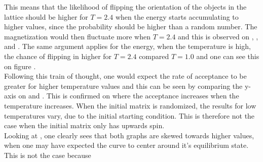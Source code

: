 \documentclass[10pt,a4paper]{article}
\begin{document}
\noindent This means that the likelihood of flipping the orientation of the objects in the lattice should be higher for $T = 2.4$ when the energy starts accumulating to higher values, since the probability should be higher than a random number. The magnetization would then fluctuate more when $T = 2.4$ and this is observed on , ,  and . The same argument applies for the energy, when the temperature is high, the chance of flipping in higher for $T = 2.4$ compared $T = 1.0$ and one can see this on figure  .
\\
Following this train of thought, one would expect the rate of acceptance to be greater for higher temperature values and this can be seen by comparing the y-axis on  and . This is confirmed on  where the acceptance increases when the temperature increases. When the initial matrix is randomized, the results for low temperatures vary, due to the initial starting condition. This is therefore not the case when the initial matrix only has upwards spin.
\\
Looking at , one clearly sees that both graphs are skewed towards higher values, when one may have expected the curve to center around it's equilibrium state. This is not the case because 
\end{document}
